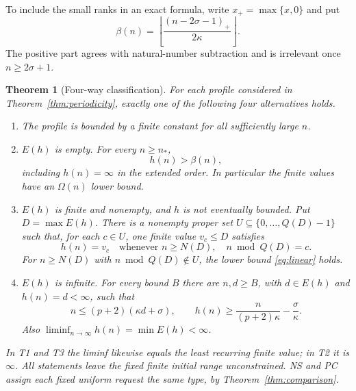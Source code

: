\documentclass[11pt,a4paper]{article}
\newtheorem{theorem}{Theorem}[section]
\theoremstyle{definition}\newtheorem{definition}[theorem]{Definition}
\theoremstyle{remark}\newtheorem{remark}[theorem]{Remark}
\begin{document}
To include the small ranks in an exact formula, write $x_+=\max\{x,0\}$
and put
\[
             \beta(n)=\left\lfloor
                       \frac{(n-2\sigma-1)_+}{2\kappa}
                       \right\rfloor.
\]
The positive part agrees with natural-number subtraction and is irrelevant
once $n\ge2\sigma+1$.

\begin{theorem}[Four-way classification]\label{thm:classification}
For each profile considered in Theorem~\ref{thm:periodicity}, exactly one
of the following four alternatives holds.
\begin{enumerate}[label=\textup{T\arabic*.}]
\item The profile is bounded by a finite constant for all sufficiently
large $n$.
\item $E(h)$ is empty. For every $n\ge n_*$,
\begin{equation}\label{eq:linear}
                              h(n)>\beta(n),
\end{equation}
including $h(n)=\infty$ in the extended order. In particular the finite
values have an $\Omega(n)$ lower bound.
\item $E(h)$ is finite and nonempty, and $h$ is not eventually bounded.
Put $D=\max E(h)$. There is a nonempty proper set
$U\subseteq\{0,\ldots,Q(D)-1\}$ such that, for each $c\in U$, one
finite value $v_c\le D$ satisfies
\[
        h(n)=v_c\quad\text{whenever }n\ge N(D),\quad n\bmod Q(D)=c.
\]
For $n\ge N(D)$ with $n\bmod Q(D)\notin U$, the lower bound
\eqref{eq:linear} holds.
\item $E(h)$ is infinite. For every bound $B$ there are $n,d\ge B$,
with $d\in E(h)$ and $h(n)=d<\infty$, such that
\begin{equation}\label{eq:peaks}
 n\le(p+2)(\kappa d+\sigma),\qquad
 h(n)\ge\frac{n}{(p+2)\kappa}-\frac{\sigma}{\kappa}.
\end{equation}
Also $\liminf_{n\to\infty}h(n)=\min E(h)<\infty$.
\end{enumerate}
In T1 and T3 the liminf likewise equals the least recurring finite value;
in T2 it is $\infty$. All statements leave the fixed finite initial
range unconstrained. NS and PC assign each fixed uniform request the
same type, by Theorem~\ref{thm:comparison}.
\end{theorem}
\end{document}
